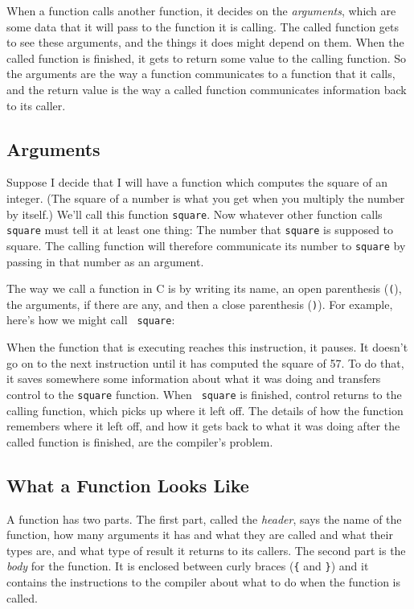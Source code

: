     When a function calls another function, it decides on the {\em
arguments}, which are some data that it will pass to the function it is
calling.  The called function gets to see these arguments, and the
things it does might depend on them.  When the called function is
finished, it gets to return some value to the calling function.  So the
arguments are the way a function communicates to a function that it
calls, and the return value is the way a called function communicates
information back to its caller.

\subsection{Arguments}

   Suppose I decide that I will have a function which computes the
square of an integer.  (The square of a number is what you get when you
multiply the number by itself.)  We'll call this function {\tt square}.
Now whatever other function calls {\tt square} must tell it at least one
thing: The number that {\tt square} is supposed to square.  The calling
function will therefore communicate its number to {\tt square} by
passing in that number as an argument.

    The way we call a function in C is by writing its name, an open
parenthesis ({\tt (}), the arguments, if there are any, and then a close
parenthesis ({\tt )}).  For example, here's how we might call {\tt
square}:

\begin{flushleft}
\verb%    square(57);%
\end{flushleft}

When the function that is executing reaches this instruction, it pauses.
It doesn't go on to the next instruction until it has computed the square
of 57.  To do that, it saves somewhere some information about what it
was doing and transfers control to the {\tt square} function.  When {\tt
square} is finished, control returns to the calling function, which
picks up where it left off.  The details of how the function remembers
where it left off, and how it gets back to what it was doing after the
called function is finished, are the compiler's problem.

\subsection{What a Function Looks Like}

A function has two parts.  The first part, called the {\em header}, says
the name of the function, how many arguments it has and what they are
called and what their types are, and what type of result it returns to
its callers.  The second part is the {\em body} for the function.  It is
enclosed between curly braces ({\verb+{+} and {\verb+}+}) and it contains the
instructions to the compiler about what to do when the function is
called.

